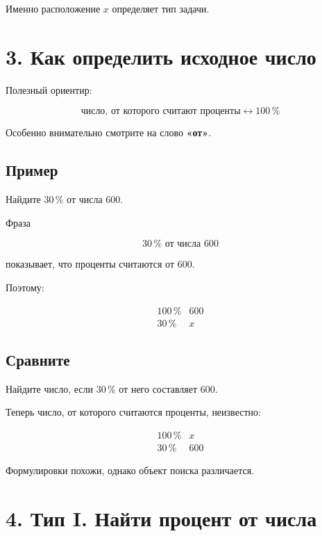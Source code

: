 \documentclass[a4paper,12pt]{article}
\newcommand{\pct}[1]{#1\,\%}
\begin{document}
Именно расположение \(x\) определяет тип задачи.


\section*{\textcolor{darkaccent}{3. Как определить исходное число}}

Полезный ориентир:

\[
\boxed{\text{число, от которого считают проценты}
\longleftrightarrow \pct{100}}
\]

Особенно внимательно смотрите на слово \textbf{«от»}.

\subsection*{Пример}

Найдите \(\pct{30}\) от числа \(600\).

Фраза

\[
\pct{30}\text{ от числа }600
\]

показывает, что проценты считаются от \(600\).

Поэтому:

\[
\begin{array}{c|c}
\pct{100} & 600\\
\pct{30} & x
\end{array}
\]

\subsection*{Сравните}

Найдите число, если \(\pct{30}\) от него составляет \(600\).

Теперь число, от которого считаются проценты, неизвестно:

\[
\begin{array}{c|c}
\pct{100} & x\\
\pct{30} & 600
\end{array}
\]

Формулировки похожи, однако объект поиска различается.


\section*{\textcolor{darkaccent}{4. Тип I. Найти процент от числа}}
\end{document}
